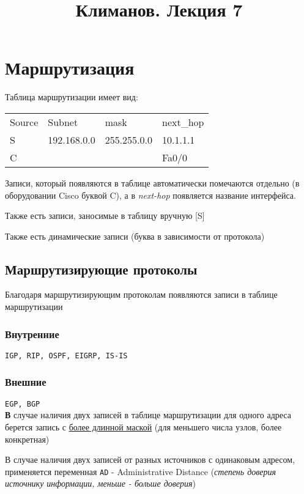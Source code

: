 \documentclass[a4paper,10pt]{article}
\title{Климанов. Лекция 7}
\begin{document}
	\maketitle
	\section{Маршрутизация}
	Таблица маршрутизации имеет вид:
	
	\begin{table}[h]
		\begin{tabular}{llll}
			Source & Subnet      & mask        & next\_hop \\
			S      & 192.168.0.0 & 255.255.0.0 & 10.1.1.1  \\
			C      &             &             & Fa0/0    
		\end{tabular}
	\end{table}

	Записи, который появляются в таблице автоматически помечаются отдельно (в оборудовании Cisco буквой C), а в \emph{next-hop} появляется название интерфейса.
	
	Также есть записи, заносимые в таблицу вручную [S]
	
	Также есть динамические записи (буква в зависимости от протокола)
	
	\subsection{Маршрутизирующие протоколы}
	
	Благодаря маршрутизирующим протоколам появляются записи в таблице маршрутизации
	
	\subsubsection{Внутренние}
	\texttt{IGP, RIP, OSPF, EIGRP, IS-IS}
	\subsubsection{Внешние}
	\texttt{EGP, BGP}
	\\
	
	\textbf{В} случае наличия двух записей в таблице маршрутизации для одного адреса берется запись с \underline{более длинной маской} (для меньшего числа узлов, более конкретная)
	
	В случае наличия двух записей от разных источников с одинаковым адресом, применяется переменная \texttt{AD} - Administrative Distance (\textit{степень доверия источнику информации, меньше - больше доверия})
	
\end{document}
